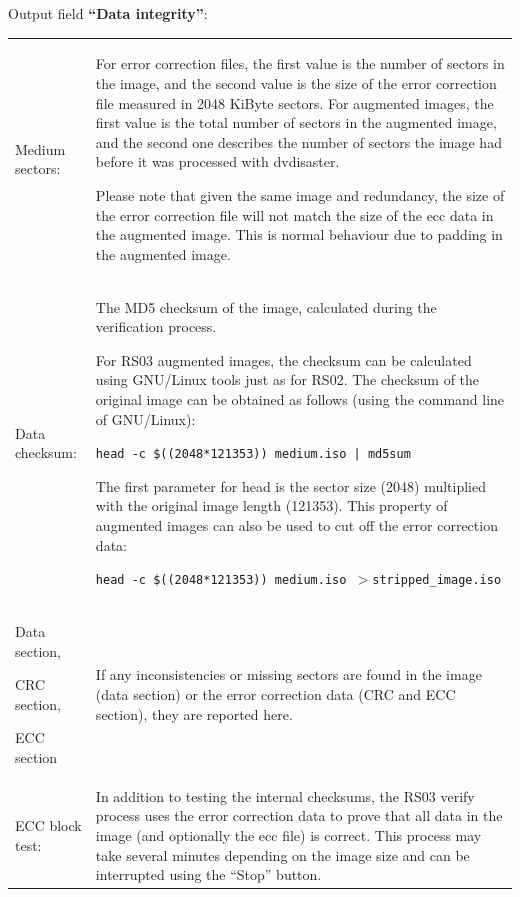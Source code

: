 \bigskip

Output field {\bf ``Data integrity''}:

\medskip

\begin{tabular}{p{29mm}p{125mm}}
  Medium sectors: &
  For error correction files, the first value is the number of
  sectors in the image, and the second value is the size of
  the error correction file measured in 2048 KiByte sectors.
  For augmented images, the first value is the total number of
  sectors in the augmented image, and the second one describes
  the number of sectors the image had before it was processed with dvdisaster.

  \smallskip
  
  Please note that given the same image and redundancy, the size of
  the error correction file will not match the size of the ecc data
  in the augmented image. This is normal behaviour due to padding
  in the augmented image.\\[2mm]
 	
  Data checksum: &
  The MD5 checksum of the image, calculated during the verification process.

  \smallskip
  
  For RS03 augmented images, the checksum can be calculated using
  GNU/Linux tools just as for RS02. The checksum of the original image
  can be obtained as follows (using the command line of GNU/Linux):

  \smallskip
  
  {\tt head -c \$((2048*121353)) medium.iso | md5sum}

  \smallskip
    
  The first parameter for head is the sector size (2048) multiplied
  with the original image length (121353). This property of augmented
  images can also be used to cut off the error correction data:

  \smallskip

  {\tt head -c \$((2048*121353)) medium.iso $>$stripped\_image.iso}\\[2mm]

    Data section,\par
    CRC section,\par
    ECC section &
  If any inconsistencies or missing sectors are found in the
  image (data section) or the error correction data (CRC and ECC section),
  they are reported here.\\[2mm]
 	
  ECC block test: &
  In addition to testing the internal checksums, the RS03
  verify process uses the error correction data to prove
  that all data in the image (and optionally the ecc file)
  is correct. This process may take several minutes depending
  on the image size and can be interrupted using the ``Stop'' button. \\
\end{tabular}

